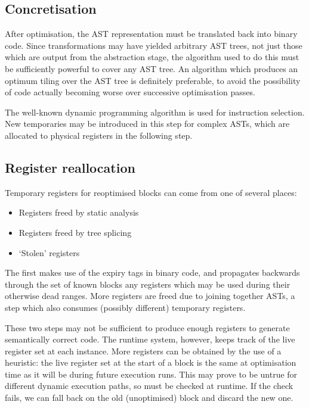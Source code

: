 \documentclass[11pt,letterpaper,twocolumn,notitlepage]{article}
\begin{document}
\subsection{Concretisation}

After optimisation, the AST representation must be translated back into binary code. Since transformations may have yielded arbitrary AST trees, not just those which are output from the abstraction stage, the algorithm used to do this must be sufficiently powerful to cover any AST tree. An algorithm which produces an optimum tiling over the AST tree is definitely preferable, to avoid the possibility of code actually becoming worse over successive optimisation passes.

The well-known dynamic programming algorithm \cite{Tiger} is used for instruction selection. New temporaries may be introduced in this step for complex ASTs, which are allocated to physical registers in the following step.

\subsection{Register reallocation}

Temporary registers for reoptimised blocks can come from one of several places:

\begin{itemize}
\item Registers freed by static analysis
\item Registers freed by tree splicing
\item `Stolen' registers
\end{itemize}

The first makes use of the expiry tags in binary code, and propagates backwards through the set of known blocks any registers which may be used during their otherwise dead ranges. More registers are freed due to joining together ASTs, a step which also consumes (possibly different) temporary registers.

These two steps may not be sufficient to produce enough registers to generate semantically correct code. The runtime system, however, keeps track of the live register set at each instance. More registers can be obtained by the use of a heuristic: the live register set at the start of a block is the same at optimisation time as it will be during future execution runs. This may prove to be untrue for different dynamic execution paths, so must be checked at runtime. If the check fails, we can fall back on the old (unoptimised) block and discard the new one.
\end{document}
